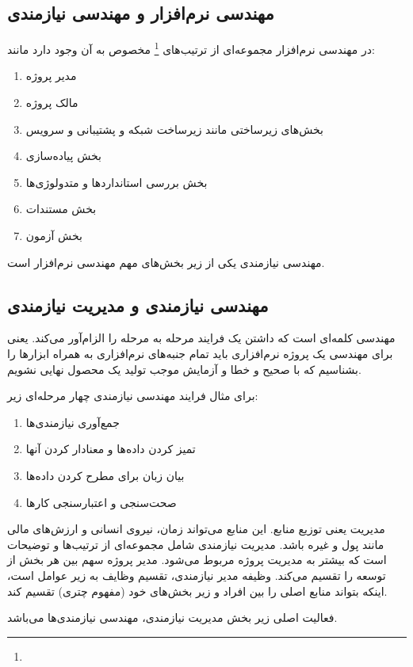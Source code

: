 \subsection{مهندسی نرم‌افزار و مهندسی نیازمندی}

در مهندسی نرم‌افزار مجموعه‌ای از ترتیب‌های \footnote{} مخصوص به
آن وجود دارد مانند:

\begin{enumerate}
    \item مدیر پروژه 
    \item مالک پروژه 
    \item بخش‌های زیرساختی مانند زیرساخت شبکه و پشتیبانی و سرویس
    \item بخش پیاده‌سازی 
    \item بخش بررسی استاندارد‌ها و متدولوژی‌ها
    \item بخش مستندات 
    \item بخش آزمون 
\end{enumerate}

مهندسی نیازمندی یکی از زیر بخش‌های مهم مهندسی نرم‌افزار است.

\subsection{مهندسی نیازمندی و مدیریت نیازمندی}

مهندسی کلمه‌ای است که داشتن یک فرایند مرحله به مرحله را الزام‌آور می‌کند. یعنی
برای مهندسی یک پروژه نرم‌افزاری باید تمام جنبه‌های نرم‌افزاری به همراه ابزار‌ها
را بشناسیم که با صحیح و خطا و آزمایش موجب تولید یک محصول نهایی نشویم.

برای مثال فرایند مهندسی نیازمندی چهار مرحله‌ای زیر:

\begin{enumerate}
    \item جمع‌آوری نیازمندی‌ها
    \item تمیز کردن داده‌ها و معنادار کردن آنها
    \item بیان زبان برای مطرح کردن داده‌ها
    \item صحت‌سنجی و اعتبارسنجی کار‌ها
\end{enumerate}

مدیریت یعنی توزیع منابع. این منابع می‌تواند زمان، نیروی انسانی و ارزش‌های مالی
مانند پول و غیره باشد. مدیریت نیازمندی شامل مجموعه‌ای از ترتیب‌ها و توضیحات است
که بیشتر به مدیریت پروژه مربوط می‌شود. مدیر پروژه سهم بین هر بخش از توسعه را
تقسیم می‌کند. وظیفه مدیر نیازمندی، تقسیم وظایف به زیر عوامل است، اینکه بتواند
منابع اصلی را بین افراد و زیر بخش‌های خود (مفهوم چتری) تقسیم کند.

فعالیت اصلی زیر بخش مدیریت نیازمندی، مهندسی نیازمندی‌ها می‌باشد.